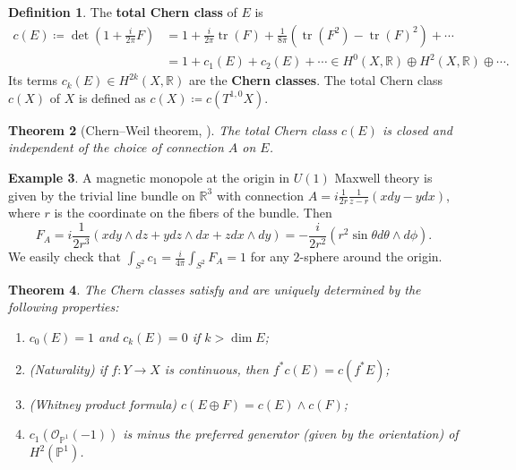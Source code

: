 \documentclass{report}
\theoremstyle{plain}
\newtheorem{theorem}{Theorem}[section]
\theoremstyle{definition}
\newtheorem{definition}[theorem]{Definition}
\newtheorem{example}[theorem]{Example}
\theoremstyle{remark}
\newcommand{\bP}{\mathbb{P}}
\newcommand{\bR}{\mathbb{R}}
\newcommand{\cO}{\mathcal{O}}
\DeclareMathOperator{\tr}{tr}
\begin{document}
\begin{definition}
  The {\bf total Chern class} of $E$ is
  \begin{align*}
    c(E) \coloneqq \det\left(1 + \frac{i}{2\pi}F\right)
    &= 1 + \frac{i}{2\pi} \tr(F) + \frac{1}{8\pi}(\tr(F^2) - \tr(F)^2) + \cdots \\
    &= 1 + c_1(E) + c_2(E) + \cdots \in H^0(X, \bR) \oplus H^2(X, \bR) \oplus \cdots.
  \end{align*}
  Its terms $c_k(E) \in H^{2k}(X, \bR)$ are the {\bf Chern classes}.
  The total Chern class $c(X)$ of $X$ is defined as $c(X) \coloneqq
  c(T^{1,0}X)$.
\end{definition}

\begin{theorem}[Chern--Weil theorem, {\cite[Corollary 4.4.5, Lemma 4.4.6]{Huybrechts2005}}]
  The total Chern class $c(E)$ is closed and independent of the choice
  of connection $A$ on $E$.
\end{theorem}

\begin{example}
  A magnetic monopole at the origin in $U(1)$ Maxwell theory is given
  by the trivial line bundle on $\bR^3$ with connection $A =
  i\frac{1}{2r} \frac{1}{z-r} (x dy - y dx)$, where $r$ is the
  coordinate on the fibers of the bundle. Then
  \[ F_A = i\frac{1}{2r^3} (x dy \wedge dz + y dz \wedge dx + z dx \wedge dy) = -\frac{i}{2r^2}(r^2 \sin \theta d\theta \wedge d\phi). \]
  We easily check that $\int_{S^2} c_1 = \frac{i}{4\pi} \int_{S^2} F_A
  = 1$ for any $2$-sphere around the origin.
\end{example}

\begin{theorem} \label{thm:chern-axioms}
  The Chern classes satisfy and are uniquely determined by the
  following properties:
  \begin{enumerate}
  \item $c_0(E) = 1$ and $c_k(E) = 0$ if $k > \dim E$;
  \item (Naturality) if $f\colon Y \to X$ is continuous, then $f^*c(E)
    = c(f^*E)$;
  \item (Whitney product formula) $c(E \oplus F) = c(E) \wedge c(F)$;
  \item $c_1(\cO_{\bP^1}(-1))$ is minus the preferred generator (given
    by the orientation) of $H^2(\bP^1)$.
  \end{enumerate}
\end{theorem}
\end{document}
